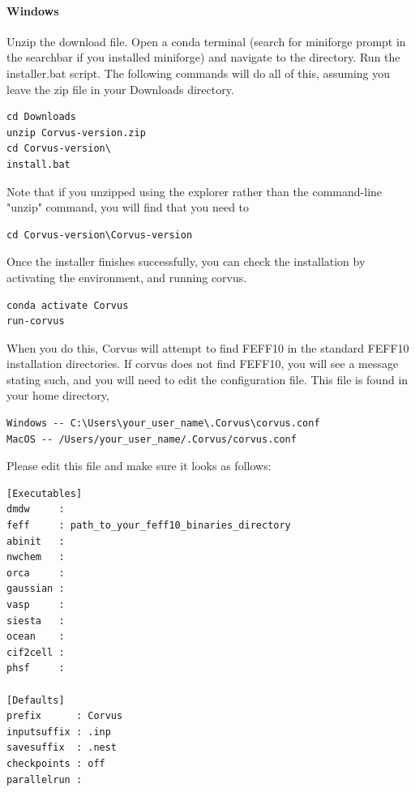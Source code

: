 \paragraph{Windows} Unzip the download file. Open a conda terminal (search for miniforge prompt in the searchbar if you installed miniforge) and navigate to the directory. Run the installer.bat script.
The following commands will do all of this, assuming you leave the zip file in your Downloads directory.
\begin{verbatim}
cd Downloads
unzip Corvus-version.zip
cd Corvus-version\
install.bat
\end{verbatim}
Note that if you unzipped using the explorer rather than the command-line "unzip" command, you will find that you need to 
\begin{verbatim}
cd Corvus-version\Corvus-version
\end{verbatim}

Once the installer finishes successfully, you can check the installation by activating the environment,
and running corvus.
\begin{verbatim}
conda activate Corvus
run-corvus
\end{verbatim}
When you do this,
Corvus will attempt to find FEFF10 in the standard FEFF10 installation directories. If corvus does not
find FEFF10, you will see a message stating such, and you will need to edit the configuration file.
This file is found in your home directory, 
\begin{verbatim}
Windows -- C:\Users\your_user_name\.Corvus\corvus.conf
MacOS -- /Users/your_user_name/.Corvus/corvus.conf
\end{verbatim}

Please edit this file and make sure it looks as follows:
\begin{verbatim}
[Executables]
dmdw     :
feff     : path_to_your_feff10_binaries_directory
abinit   :
nwchem   :
orca     :
gaussian :
vasp     :
siesta   :
ocean    :
cif2cell :
phsf     :

[Defaults]
prefix      : Corvus
inputsuffix : .inp
savesuffix  : .nest
checkpoints : off
parallelrun :
\end{verbatim}


